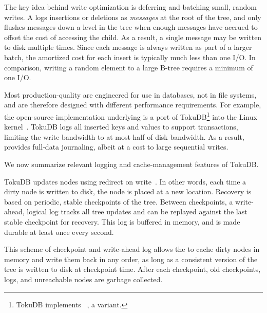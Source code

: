 \vspace{5pt}
The key idea behind write optimization is deferring and batching
small, random writes.  A \bet logs
insertions or deletions as \emph{messages} at the root of the tree,
and only flushes messages down a level in the tree when enough
messages have accrued to offset the cost of accessing the child.  As a
result, a single message may be written to disk multiple times.
Since each message is always written as part of a larger batch, the amortized
cost for each insert is typically much less than one I/O.  In
comparison, writing a random element to a large B-tree requires a
minimum of one I/O.


Most production-quality \wods
are engineered for use in databases,
not in file systems, and are therefore designed with different
performance requirements. For example, the open-source \wod implementation
underlying \betrfs is a port of 
TokuDB\footnote{TokuDB implements
  \ftis~\cite{BenderFaFi07}, a \bet variant.}
 into the Linux kernel~\cite{TokuDB}.
TokuDB logs all inserted keys and values to support transactions,  
limiting the write bandwidth to at most half of disk bandwidth. As a
result, \betrfs provides full-data journaling, albeit at a cost to
large sequential writes. %


\vspace{5pt}
We now summarize relevant logging and cache-management features of TokuDB.

TokuDB updates \bet nodes using redirect on write~\cite{Neeta06}.
In other words, each time
a dirty node is written to disk, the node is placed
at a new location.
Recovery is based on periodic, stable checkpoints of the
tree.  Between checkpoints, a write-ahead, logical log tracks all
tree updates and can be replayed against the last stable
checkpoint for recovery.
This log is buffered in memory, and is made durable at least once every second.


This scheme of checkpoint and write-ahead log allows the \bet to cache dirty
nodes in memory and write them back in any order, as long as a
consistent version of the tree is written to disk at checkpoint time.
After each checkpoint, old checkpoints, logs, and unreachable nodes
are garbage collected.

